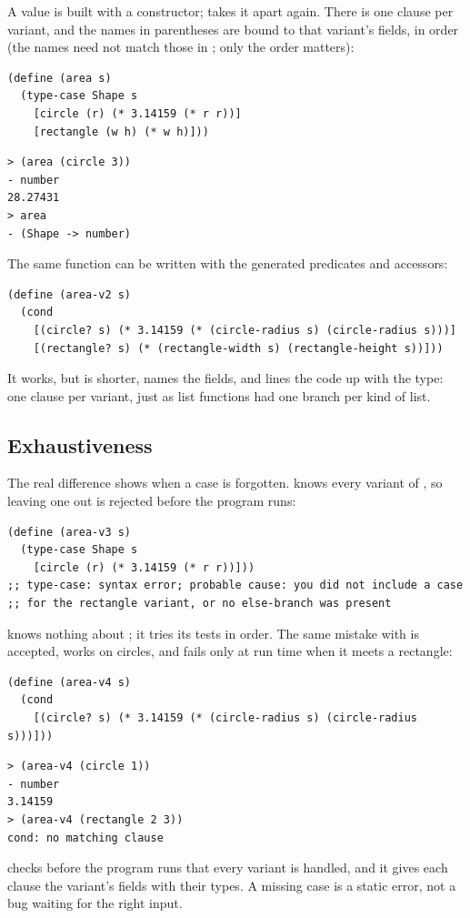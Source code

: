 A  value is built with a constructor;  takes it apart again. There is one clause per variant, and the names in parentheses are bound to that variant's fields, in order (the names need not match those in ; only the order matters):
\begin{lstlisting}
(define (area s)
  (type-case Shape s
    [circle (r) (* 3.14159 (* r r))]
    [rectangle (w h) (* w h)]))
\end{lstlisting}
\begin{lstlisting}[style=repl]
> (area (circle 3))
- number
28.27431
> area
- (Shape -> number)
\end{lstlisting}
The same function can be written with the generated predicates and accessors:
\begin{lstlisting}
(define (area-v2 s)
  (cond
    [(circle? s) (* 3.14159 (* (circle-radius s) (circle-radius s)))]
    [(rectangle? s) (* (rectangle-width s) (rectangle-height s))]))
\end{lstlisting}
It works, but  is shorter, names the fields, and lines the code up with the type: one clause per variant, just as list functions had one  branch per kind of list.

\subsection{Exhaustiveness}

The real difference shows when a case is forgotten.  knows every variant of , so leaving one out is rejected before the program runs:
\begin{lstlisting}
(define (area-v3 s)
  (type-case Shape s
    [circle (r) (* 3.14159 (* r r))]))
;; type-case: syntax error; probable cause: you did not include a case
;; for the rectangle variant, or no else-branch was present
\end{lstlisting}
 knows nothing about ; it tries its tests in order. The same mistake with  is accepted, works on circles, and fails only at run time when it meets a rectangle:
\begin{lstlisting}
(define (area-v4 s)
  (cond
    [(circle? s) (* 3.14159 (* (circle-radius s) (circle-radius s)))]))
\end{lstlisting}
\begin{lstlisting}[style=repl]
> (area-v4 (circle 1))
- number
3.14159
> (area-v4 (rectangle 2 3))
cond: no matching clause
\end{lstlisting}

\begin{keypoint}
 checks before the program runs that every variant is handled, and it gives each clause the variant's fields with their types. A missing case is a static error, not a bug waiting for the right input.
\end{keypoint}
